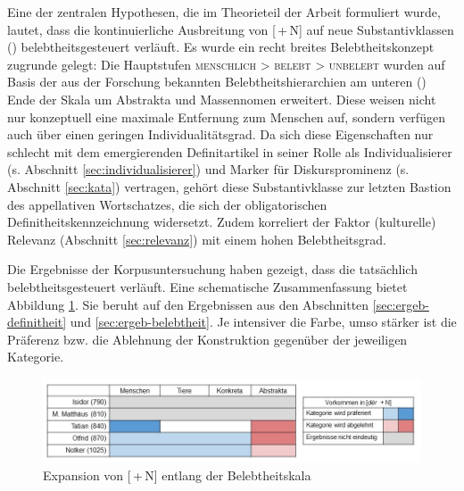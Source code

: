 Eine der zentralen Hypothesen, die im Theorieteil der Arbeit formuliert wurde, lautet, dass die kontinuierliche Ausbreitung von [\,+\,N] auf neue Substantivklassen () belebtheitsgesteuert verläuft. Es wurde ein recht breites Belebtheitskonzept zugrunde gelegt: Die Hauptstufen \textsc{menschlich > belebt > unbelebt} wurden auf Basis der aus der Forschung bekannten Belebtheitshierarchien \parencite[u.a.][]{Comrie1989,Yamamoto1999,Croft2006,Enger2011} am unteren () Ende der Skala um Abstrakta und Massennomen erweitert. Diese weisen nicht nur konzeptuell eine maximale Entfernung zum Menschen auf, sondern verfügen auch über einen geringen Individualitätsgrad. Da sich diese Eigenschaften nur schlecht mit dem emergierenden Definitartikel in seiner Rolle als Individualisierer (s. Abschnitt \ref{sec:individualisierer}) und Marker für Diskursprominenz (s. Abschnitt \ref{sec:kata}) vertragen, gehört diese Substantivklasse zur letzten Bastion des appellativen Wortschatzes, die sich der obligatorischen Definitheitskennzeichnung widersetzt. Zudem korreliert der Faktor (kulturelle) Relevanz (Abschnitt \ref{sec:relevanz}) mit einem hohen Belebtheitsgrad. 

Die Ergebnisse der Korpusuntersuchung haben gezeigt, dass die  tatsächlich belebtheitsgesteuert verläuft. Eine schematische Zusammenfassung bietet Abbildung \ref{abb:expansion-belebtheit}. Sie beruht auf den Ergebnissen aus den Abschnitten \ref{sec:ergeb-definitheit} und \ref{sec:ergeb-belebtheit}. Je intensiver die Farbe, umso stärker ist die Präferenz bzw. die Ablehnung der Konstruktion gegenüber der jeweiligen Kategorie. 

\begin{figure}
\begin{center}
  \includegraphics[width=\textwidth]{images/belebtheitsexpansion-neu2.jpg}
\caption {Expansion von [\,+\,N] entlang der Belebtheitskala} 
\label{abb:expansion-belebtheit}
\end{center}
\end{figure} 
  
